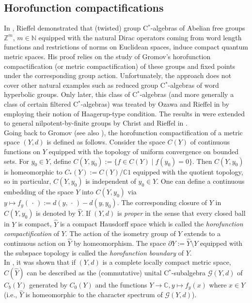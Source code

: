 \documentclass[a4paper,11pt,reqno]{amsart}
\numberwithin{equation}{section}
\numberwithin{equation}{section}
\theoremstyle{definition}
\theoremstyle{remark}
\theoremstyle{remark}
\begin{document}
\subsection{Horofunction compactifications\label{subsec:Horofunction-compactifications}}


In \cite{Rieffel02}, Rieffel demonstrated that
(twisted) group C$^{\ast}$-algebras of Abelian free groups $\mathbb{Z}^{m}$, $m \in \mathbb{N}$
equipped with the natural Dirac operators coming from word length
functions and restrictions of norms on Euclidean spaces, induce compact quantum metric spaces. His proof relies on
the study of Gromov's horofunction compactification (or metric compactification)
of these groups and fixed points under the corresponding group action.
Unfortunately, the approach does not cover other natural examples
such as reduced group C$^{\ast}$-algebras of word hyperbolic groups.
Only later, this class of C$^{\ast}$-algebras (and more generally
a class of certain filtered C$^{\ast}$-algebras) was treated by Ozawa
and Rieffel in \cite{OzawaRieffel} by employing their notion of Haagerup-type
condition. The results in \cite{Rieffel02} were extended to general
nilpotent-by-finite groups by Christ and Rieffel in \cite{ChristRieffel}.\\

Going back to Gromov \cite{Gromov} (see also \cite{Rieffel02}),
the horofunction compactification of a metric space $(Y,d)$ is defined
as follows. Consider the space $C(Y)$ of continuous functions on
$Y$ equipped with the topology of uniform convergence on bounded
sets. For $y_{0}\in Y$, define $C(Y,y_{0}):=\{f\in C(Y)\mid f(y_{0})=0\}$.
Then $C(Y,y_{0})$ is homeomorphic to $C_{\ast}(Y):=C(Y)/\mathbb{C}1$
equipped with the quotient topology, so in particular, $C(Y,y_{0})$
is independent of $y_{0}\in Y$. One can define a continuous embedding of
the space $Y$ into $C(Y,y_{0})$ via $y\mapsto f_{y}(\, \cdot \,):=d(y, \, \cdot \,)-d(y,y_{0})$.
The corresponding closure of $Y$ in $C(Y,y_{0})$ is denoted by $\widehat{Y}$.
If $(Y,d)$ is \emph{proper} in the sense that every closed ball in
$Y$ is compact, $\widehat{Y}$ is a compact Hausdorff space which
is called the \emph{horofunction compactification} of $Y$. The action
of the isometry group of $Y$ extends to a continuous action on $\widehat{Y}$
by homeomorphism. The space $\partial Y:=\widehat{Y}\setminus Y$
equipped with the subspace topology is called the \emph{horofunction
boundary} of $Y$.\\

In \cite[Section 4]{Rieffel02}, it was shown that if $(Y,d)$ is a
complete locally compact metric space, $C(\widehat{Y})$ can be described
as the (commutative) unital C$^{\ast}$-subalgebra $\mathcal{G}(Y,d)$
of $C_{b}(Y)$ generated by $C_{0}(Y)$ and the functions $Y\rightarrow\mathbb{C},y\mapsto f_{y}(x)$
where $x\in Y$ (i.e., $\widehat{Y}$ is homeomorphic to the character
spectrum of $\mathcal{G}(Y,d)$). \\
\end{document}
